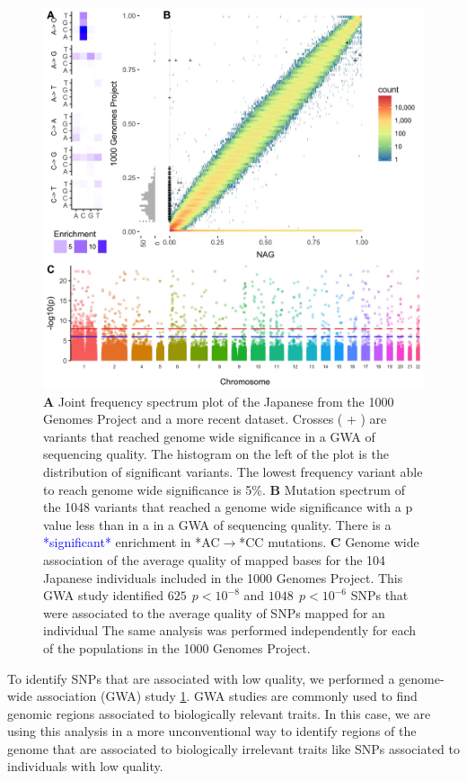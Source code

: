 \documentclass[9pt,lineno]{elife}
\newcommand{\todo}[1]{\textcolor{blue}{*#1*}}
\begin{document}
\begin{figure}
\includegraphics[width=\hsize,keepaspectratio]{Figure1.jpg}
\caption{
\textbf{A} 
Joint frequency spectrum plot of the Japanese from the 1000 Genomes Project and a more recent dataset.
Crosses ( + ) are variants that reached genome wide significance in a GWA of sequencing quality. 
The histogram on the left of the plot is the distribution of significant variants. 
The lowest frequency variant able to reach genome wide significance is 5\%.
\textbf{B} 
Mutation spectrum of the 1048 variants that reached a genome wide significance with a p value less than  in a in a GWA of sequencing quality. 
There is a \todo{significant} enrichment in *AC${\rightarrow}$*CC mutations. 
\textbf{C} 
Genome wide association of the average quality of mapped bases for the 104 Japanese individuals included in the 1000 Genomes Project. This GWA study identified $625\ \  p < 10^{-8}$ and $1048\ \ p < 10^{-6}$ SNPs that were associated to the average quality of SNPs mapped for an individual
The same analysis was performed independently for each of the populations in the 1000 Genomes Project. }
 \label{SFS}
\end{figure}

To identify SNPs that are associated with low quality, we performed a genome-wide association (GWA) study  \ref{SFS}. 
GWA studies are commonly used to find genomic regions associated to biologically relevant traits. In this case, we are using this analysis in a more unconventional way to identify regions of the genome that are associated to biologically irrelevant traits like SNPs associated to individuals with low quality.
 
\end{document}
